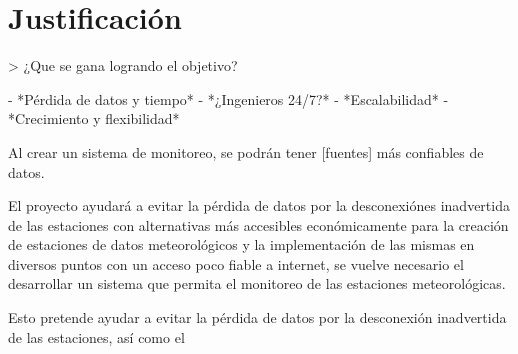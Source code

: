\section{Justificación}

> ¿Que se gana logrando el objetivo?

- *Pérdida de datos y tiempo*
- *¿Ingenieros 24/7?*
- *Escalabilidad*
- *Crecimiento y flexibilidad*

Al crear un sistema de monitoreo, se podrán tener [fuentes] más confiables de datos.

El proyecto ayudará a evitar la pérdida de datos por la desconexiónes inadvertida de las estaciones con alternativas más accesibles económicamente para la creación de estaciones de datos meteorológicos \cite{hernandezimplementacion} y la implementación de las mismas en diversos puntos con un acceso poco fiable a internet, se vuelve necesario el desarrollar un sistema que permita el monitoreo de las estaciones meteorológicas.

Esto pretende ayudar a evitar la pérdida de datos por la desconexión inadvertida de las estaciones, así como el

